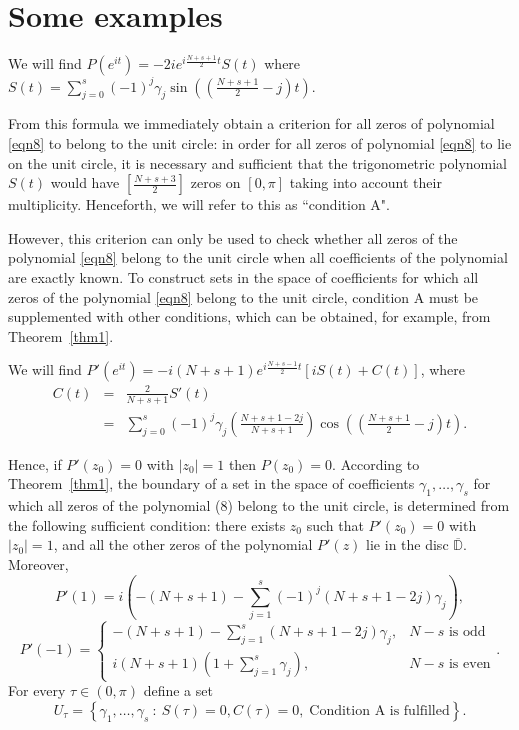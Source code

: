 \documentclass[12pt]{article}
\newcommand{\abs}[1]{\left|#1\right|}
\newcommand{\pa}[1]{\left(#1\right)}
\newcommand{\br}[1]{\left[#1\right]}
\newcommand{\cb}[1]{\left\{#1\right\}}
\begin{document}
\section{Some examples}

We will find $\displaystyle P(e^{it}) = -2ie^{i\frac{N + s + 1}{2}t} S(t)$ where $\displaystyle S(t) = \sum_{j = 0}^{s}(-1)^j\gamma_j\sin\pa{\pa{\frac{N + s + 1}{2} - j}t}$.

From this formula we immediately obtain a criterion for all zeros of polynomial \eqref{eqn8} to belong to the unit circle: in order for all zeros of polynomial \eqref{eqn8} to lie on the unit circle, it is necessary and sufficient that the trigonometric polynomial $S(t)$ would have $\displaystyle \br{\frac{N + s + 3}{2}}$ zeros on $\br{0,\pi}$ taking into account their multiplicity. Henceforth, we will refer to this as ``condition A". 

However, this criterion can only be used to check whether all zeros of the polynomial \eqref{eqn8} belong to the unit circle when all coefficients of the polynomial are exactly known. To construct sets in the space of coefficients for which all zeros of the polynomial \eqref{eqn8} belong to the unit circle, condition A must be supplemented with other conditions, which can be obtained, for example, from Theorem~\ref{thm1}.

We will find $\displaystyle P'(e^{it}) = -i(N + s + 1)e^{i\frac{N + s - 1}{2}t}\br{iS(t) + C(t)}$, where
\begin{eqnarray*}
C(t) &=& \frac{2}{N + s + 1}S'(t) \\
&=& \sum_{j = 0}^{s}(-1)^j\gamma_j\pa{\frac{N + s + 1 - 2j}{N + s + 1}}\cos\pa{\pa{\frac{N + s + 1}{2} - j}t}. 
\end{eqnarray*}

Hence, if $P'(z_0)  = 0$ with $\abs{z_0} = 1$ then $P(z_0) = 0$. According to Theorem~\ref{thm1}, the boundary of a set in the space of coefficients $\gamma_1, \ldots, \gamma_s$ for which all zeros of the polynomial (8) belong to the unit circle, is determined from the following sufficient condition: there exists $z_0$ such that $P'(z_0) = 0$ with $\abs{z_0} = 1$, and all the other zeros of the polynomial $P'(z)$ lie in the disc $\overline{\mathbb D}$. Moreover,
\begin{displaymath}
P'(1) = i\pa{-(N + s + 1) - \sum_{j = 1}^{s}(-1)^j(N + s + 1 - 2j)\gamma_j},
\end{displaymath}
\begin{displaymath}
P'(-1) = \begin{cases}
\displaystyle -(N + s + 1) - \sum_{j = 1}^{s}(N + s + 1 - 2j)\gamma_j, & N - s \mbox{ is odd} \\
\displaystyle i(N + s + 1)\pa{1 + \sum_{j = 1}^{s}\gamma_j}, & N - s \mbox{ is even}
\end{cases}.
\end{displaymath}
For every $\tau \in \pa{0,\pi}$ define a set
\begin{displaymath}
U_\tau = \cb{\gamma_1, \ldots, \gamma_s \ : \ S(\tau) = 0, C(\tau) = 0,\; \mbox{Condition A is fulfilled}}.
\end{displaymath}
\end{document}
